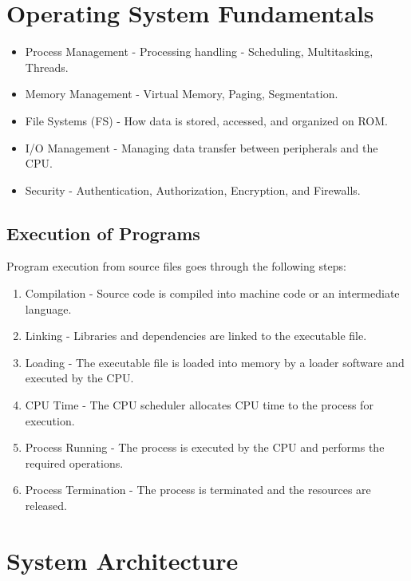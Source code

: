 \documentclass[12pt letter]{report}
\begin{document}
\section{Operating System Fundamentals}


\begin{itemize}
  \item Process Management - Processing handling - Scheduling, Multitasking, Threads.
  \item Memory Management - Virtual Memory, Paging, Segmentation.
  \item File Systems (FS) - How data is stored, accessed, and organized on ROM.
  \item I/O Management - Managing data transfer between peripherals and the CPU.
  \item Security - Authentication, Authorization, Encryption, and Firewalls.
\end{itemize}

\subsection{Execution of Programs}

Program execution from source files goes through  the following steps:
\begin{enumerate}
  \item Compilation - Source code is compiled into machine code or an intermediate language.
  \item Linking - Libraries and dependencies are linked to the executable file.
  \item Loading - The executable file is loaded into memory by a loader software and executed by the CPU.
  \item CPU Time - The CPU scheduler allocates CPU time to the process for execution.
  \item Process Running - The process is executed by the CPU and performs the required operations.
  \item Process Termination - The process is terminated and the resources are released.
\end{enumerate}

\section{System Architecture}
\end{document}
